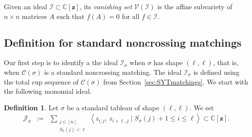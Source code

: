 \documentclass[11pt]{amsart}
\theoremstyle{remark}
\theoremstyle{remark}
\theoremstyle{definition}
\theoremstyle{definition}
\theoremstyle{definition}
\newtheorem{definition}[theorem]{Definition}
\numberwithin{equation}{section}
\newcommand{\C}{\mathbb{C}}           %
\newcommand{\gs}{\sigma}
\newcommand{\cc}{\mathcal{C}}
\newcommand{\ci}{\mathcal{I}}
\newcommand{\cj}{\mathcal{J}}
\newcommand{\cv}{\mathcal{V}}
\newcommand{\cupsigma}{\cc(\gs)}
\newcommand{\isigma}{\ci_\gs}
\begin{document}
Given an ideal $\ci\subset \C[\mathbf{z}]$, its \emph{vanishing set} $\cv(\ci)$ is the affine subvariety of $n\times n$ matrices $A$ such that $f(A)=0$ for all $f\in \ci$. 

\subsection{Definition for standard noncrossing matchings} Our first step is to identify a the ideal $\ci_\gs$ when $\gs$ has shape $(\ell, \ell)$, that is, when $\cupsigma$ is a standard noncrossing matching. The ideal $\isigma$ is defined using the total cup sequence of $\cupsigma$ from Section~\ref{sec:SYTmatchings}. We start with the following monomial ideal.

\begin{definition}\label{def:JSigma} Let $\gs$ be a standard tableau of shape $(\ell, \ell)$. We set
\begin{eqnarray*}
\cj_\gs &:=& \sum_{\substack{j\in [n]\\ S_\sigma(j)<\ell}}\left< z_{i,j}, \, z_{i+\ell, j} \mid S_\gs(j)+1\leq i \leq \ell \right> \subset \C[\mathbf{z}].
\end{eqnarray*}
\end{definition}
\end{document}
